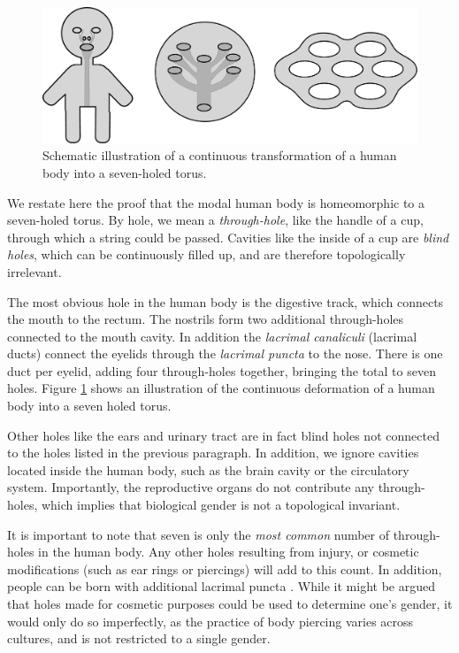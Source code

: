 \documentclass[11pt]{article}
\begin{document}
\begin{figure}
    \centering
    \includegraphics[width=.9\textwidth]{../plots/human-torus.pdf}
    \caption{Schematic illustration of a continuous transformation of a human body into a seven-holed torus.} \label{fig:torus}
\end{figure}

We restate here the proof that the modal human body is homeomorphic to a seven-holed torus. By hole, we mean a \textit{through-hole}, like the handle of a cup, through which a string could be passed. Cavities like the inside of a cup are \textit{blind holes}, which can be continuously filled up, and are therefore topologically irrelevant.

The most obvious hole in the human body is the digestive track, which connects the mouth to the rectum. The nostrils form two additional through-holes connected to the mouth cavity. In addition the \textit{lacrimal canaliculi} (lacrimal ducts) connect the eyelids through the \textit{lacrimal puncta} to the nose. There is one duct per eyelid, adding four through-holes together, bringing the total to seven holes. Figure \ref{fig:torus} shows an illustration of the continuous deformation of a human body into a seven holed torus.

Other holes like the ears and urinary tract are in fact blind holes not connected to the holes listed in the previous paragraph. In addition, we ignore cavities located inside the human body, such as the brain cavity or the circulatory system. Importantly, the reproductive organs do not contribute any through-holes, which implies that biological gender is not a topological invariant.

It is important to note that seven is only the \textit{most common} number of through-holes in the human body. Any other holes resulting from injury, or cosmetic modifications (such as ear rings or piercings) will add to this count. In addition, people can be born with additional lacrimal puncta \cite{Saleh2021}. While it might be argued that holes made for cosmetic purposes could be used to determine one's gender, it would only do so imperfectly, as the practice of body piercing varies across cultures, and is not restricted to a single gender.
\end{document}

